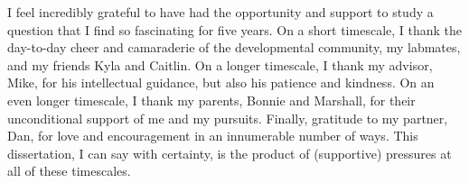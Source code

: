 \documentclass[12pt]{report}
\begin{document}
I feel incredibly grateful to have had the opportunity and support to study a question that I find so fascinating for five years. On a short timescale, I thank the day-to-day cheer and camaraderie of the developmental community, my labmates, and my friends Kyla and Caitlin. On a longer timescale, I thank my advisor, Mike, for his intellectual guidance, but also his patience and kindness. On an even longer timescale, I thank my parents, Bonnie and Marshall, for their unconditional support of me and my pursuits. Finally, gratitude to my partner, Dan, for love and encouragement in an innumerable number of ways. This dissertation, I can say with certainty, is the product of (supportive) pressures at all of these timescales.  



\afterpreface












\end{document}
